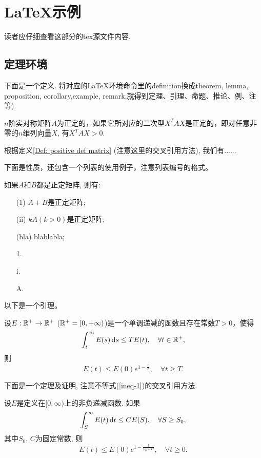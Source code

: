 \section{\LaTeX 示例}

读者应仔细查看这部分的tex源文件内容.

\subsection{定理环境}

下面是一个定义. 将对应的\LaTeX{}环境命令里的definition换成theorem, lemma, proposition, corollary,example, remark,就得到定理、引理、命题、推论、例、注等).
\begin{definition}\label{Def: positive def matrix}
  $n$阶实对称矩阵$A$为正定的，如果它所对应的二次型$X^T A X$是正定的，即对任意非零的$n$维列向量$X$, 有$X^T A X>0$.
\end{definition}

根据定义\ref{Def: positive def matrix} (注意这里的交叉引用方法), 我们有......

下面是性质，还包含一个列表的使用例子，注意列表编号的格式。
\begin{property}\label{Property: positive matrix}
  如果$A$和$B$都是正定矩阵, 则有:
  \begin{itemize}
    \item[(1)]$A+B$是正定矩阵;
    \item[(ii)]$kA$$(k>0)$是正定矩阵;
    \item[(bla)]blablabla;
    \item[1.]
    \item[i.]
    \item[A.]
  \end{itemize}
\end{property}

以下是一个引理。
\begin{lemma}
  设$E:\Bbb{R}^+ \to \Bbb{R}^+$ ($\Bbb{R}^+=[0,+\infty)$)是一个单调递减的函数且存在常数$T>0$，使得
  $$\int_t^{\infty} E(s) \mathop{}\!\mathrm{d} s \leq TE(t),\quad \forall t\in \Bbb{R}^+,$$
  则
  $$E(t)\leq E(0) e^{1- \frac{t}{T}},\quad \forall t\geq T. $$
\end{lemma}

下面是一个定理及证明, 注意不等式(\ref{ineq-1})的交叉引用方法.
\begin{theorem}
  设$E$是定义在$[0,\infty)$上的非负递减函数. 如果
  \begin{equation}\label{ineq-1}  %
    \int_S^{\infty} E(t) \d t \leq CE(S),\quad \forall S\geq S_0,
  \end{equation}
  其中$S_0$, $C$为固定常数, 则
  $$E(t)\leq E(0)e^{1-\frac{t}{S_0+C}},\quad \forall t\geq 0.$$
\end{theorem}


